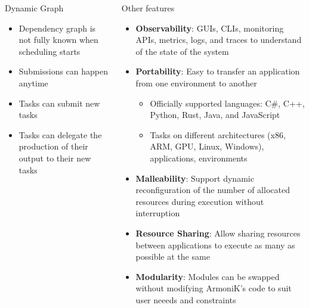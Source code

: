 \begin{frame}[fragile]
  \begin{columns}[T]
    \begin{column}{.47\textwidth}
          \begin{block}{Dynamic Graph}
          \begin{itemize}
              \item Dependency graph is not fully known when scheduling starts
              \item Submissions can happen anytime
              \item Tasks can submit new tasks
              \item Tasks can delegate the production of their output to their new tasks
          \end{itemize}
          \centering
          
          \end{block}
    \end{column}
    \begin{column}{.47\textwidth}
            \begin{block}{Other features}
                \begin{itemize}
                \item \textbf{Observability}: GUIs, CLIs, monitoring APIs, metrics, logs, and traces to understand of the state of the system
                \item \textbf{Portability}: Easy to transfer an application from one environment to another
                \begin{itemize}
                    \item Officially supported languages: C\#, C++, Python, Rust, Java, and JavaScript
                    \item Tasks on different architectures (x86, ARM, GPU, Linux, Windows), applications, environments
                \end{itemize}
                \item \textbf{Malleability}: Support dynamic reconfiguration of the number of allocated resources during execution without interruption
                \item \textbf{Resource Sharing}: Allow sharing resources between applications to execute as many as possible at the same
                \item \textbf{Modularity}: Modules can be swapped without modifying ArmoniK's code to suit user neeeds and constraints
                \end{itemize}
                \vspace{1cm}
            \end{block}
    \end{column}
  \end{columns}
  \vfill\vfill



\end{frame}
